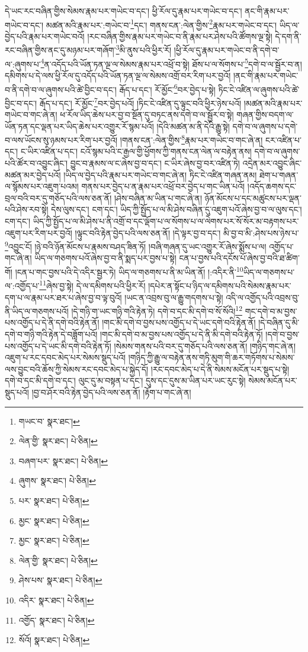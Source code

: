 དེ་ཡང་རང་བཞིན་གྱིས་སེམས་རྣམ་པར་གཡེང་བ་དང་། ཕྱི་རོལ་དུ་རྣམ་པར་གཡེང་བ་དང་། ནང་གི་རྣམ་པར་གཡེང་བ་དང་། མཚན་མའི་རྣམ་པར་:གཡེང་བ་\footnote{གཡང་བ་  སྣར་ཐང་། }དང་། གནས་ངན་:ལེན་གྱིས་\footnote{ལེན་གྱི་  སྣར་ཐང་།  པེ་ཅིན། }རྣམ་པར་གཡེང་བ་དང་། ཡིད་ལ་བྱེད་པའི་རྣམ་པར་གཡེང་བའོ། །རང་བཞིན་གྱིས་རྣམ་པར་གཡེང་བ་ནི་རྣམ་པར་ཤེས་པའི་ཚོགས་ལྔ་སྟེ། དེ་དག་ནི་རང་བཞིན་གྱིས་ནང་དུ་མཉམ་པར་གཞོག་\footnote{བཞག་པར་  སྣར་ཐང་།  པེ་ཅིན། }མི་ནུས་པའི་ཕྱིར་རོ། །ཕྱི་རོལ་དུ་རྣམ་པར་གཡེང་བ་ནི་དགེ་བ་ལ་:ཞུགས་པ་\footnote{ཞུགས་  སྣར་ཐང་།  པེ་ཅིན། }ན་འདོད་པའི་ཡོན་ཏན་ལྔ་ལ་སེམས་རྣམ་པར་འཕྲོ་བ་སྟེ། ཐོས་པ་ལ་སོགས་པ་\footnote{པར་  སྣར་ཐང་།  པེ་ཅིན། }དགེ་བ་ལ་སྦྱོར་བ་ན། དམིགས་པ་དེ་ལས་ཕྱི་རོལ་དུ་འདོད་པའི་ཡོན་ཏན་ལྔ་ལ་སེམས་འགྲོ་བར་རིག་པར་བྱའོ། །ནང་གི་རྣམ་པར་གཡེང་བ་ནི་དགེ་བ་ལ་ཞུགས་པའི་ཚེ་བྱིང་བ་དང་། རྒོད་པ་དང་། རོ་མྱོང་\footnote{མྱང་  སྣར་ཐང་།  པེ་ཅིན། }བར་བྱེད་པ་སྟེ། ཏིང་ངེ་འཛིན་ལ་ཞུགས་པའི་ཚེ་བྱིང་བ་དང་། རྒོད་པ་དང་། རོ་མྱོང་\footnote{མྱང་  སྣར་ཐང་།  པེ་ཅིན། }བར་བྱེད་པའོ། །ཏིང་ངེ་འཛིན་དུ་ལྟུང་བའི་ཕྱིར་ཉེས་པའོ། །མཚན་མའི་རྣམ་པར་གཡེང་བ་གང་ཞེ་ན། ཕ་རོལ་ཡིད་ཆེས་པར་བྱ་བ་སྔོན་དུ་བཏང་ནས་དགེ་བ་ལ་སྦྱོར་བ་སྟེ། གཞན་གྱིས་བདག་ལ་ཡོན་ཏན་དང་ལྡན་པར་ཡིད་ཆེས་པར་འགྱུར་རོ་སྙམ་པའོ། །དེའི་མཚན་མ་ནི་དེའི་རྒྱུ་སྟེ། དགེ་བ་ལ་ཞུགས་པ་དགེ་བ་ལས་ཡོངས་སུ་ཉམས་པར་རིག་པར་བྱའོ། །གནས་ངན་:ལེན་གྱིས་\footnote{ལེན་གྱི་  སྣར་ཐང་།  པེ་ཅིན། }རྣམ་པར་གཡེང་བ་གང་ཞེ་ན། ངར་འཛིན་པ་དང་། ང་ཡིར་འཛིན་པ་དང་། ངའོ་སྙམ་པའི་ང་རྒྱལ་གྱི་ཕྱོགས་ཀྱི་གནས་ངན་ལེན་ལ་བརྟེན་ནས། དགེ་བ་ལ་ཞུགས་པའི་ཚོར་བ་འབྱུང་ཞིང་། བྱུང་བ་རྣམས་ལ་ང་ཞེས་བྱ་བ་དང་། ང་ཡིར་ཞེས་བྱ་བར་འཛིན་ཏེ། འདྲེན་མར་འབྱུང་ཞིང་མཚན་མར་བྱེད་པའོ། །ཡིད་ལ་བྱེད་པའི་རྣམ་པར་གཡེང་བ་གང་ཞེ་ན། ཏིང་ངེ་འཛིན་གཞན་ནམ། ཐེག་པ་གཞན་ལ་སྙོམས་པར་འཇུག་པའམ། གནས་པར་བྱེད་པ་ན་རྣམ་པར་འཕྲོ་བར་བྱེད་པ་གང་ཡིན་པའོ། །འདོད་ཆགས་དང་བྲལ་བའི་བར་དུ་གཅོད་པའི་ལས་ཅན་ནོ། །ཤེས་བཞིན་མ་ཡིན་པ་གང་ཞེ་ན། ཉོན་མོངས་པ་དང་མཚུངས་པར་ལྡན་པའི་ཤེས་རབ་སྟེ། དེས་ལུས་དང་། ངག་དང་། ཡིད་ཀྱི་སྤྱོད་པ་ལ་མི་ཤེས་བཞིན་དུ་འཇུག་པའོ་ཞེས་བྱ་བ་ལ་ལུས་དང་། ངག་དང་། ཡིད་ཀྱི་སྤྱོད་པ་ལ་མི་ཤེས་པ་ནི་འགྲོ་བ་དང་ལྡོག་པ་ལ་སོགས་པ་ལ་ལེགས་པར་སོ་སོར་མ་བརྟགས་པར་འཇུག་པར་རིག་པར་བྱའོ། །ལྟུང་བའི་རྟེན་བྱེད་པའི་ལས་ཅན་ནོ། །དེ་ལྟར་བྱ་བ་དང་། མི་བྱ་བ་མི་:ཤེས་པས་ཉེས་པ་\footnote{ཤེས་པས་  སྣར་ཐང་།  པེ་ཅིན། }འབྱུང་ངོ། །ཉེ་བའི་ཉོན་མོངས་པ་རྣམས་བཤད་ཟིན་ཏོ། །བཞི་གཞན་དུ་ཡང་འགྱུར་རོ་ཞེས་སྨོས་པ་ལ། འགྱོད་པ་གང་ཞེ་ན། ཡིད་ལ་གཅགས་པའོ་ཞེས་བྱ་བ་ནི་སྨད་པར་བྱས་པ་སྟེ། ངན་པ་བྱས་པའི་དངོས་པོ་ཞེས་བྱ་བའི་ཐ་ཚིག་གོ། །ངན་པ་གང་བྱས་པའི་དེ་འདིར་སྦྱར་ཏེ། ཡིད་ལ་གཅགས་པ་ནི་མ་ཡིན་ནོ། །:འདིར་ནི་\footnote{འདིར་  སྣར་ཐང་།  པེ་ཅིན། }ཡིད་ལ་གཅགས་པ་ལ་:འགྱོད་པ་\footnote{འགྱོད་  སྣར་ཐང་།  པེ་ཅིན། }ཞེས་བྱ་སྟེ། དེ་ལ་དམིགས་པའི་ཕྱིར་རོ། །དཔེར་ན་སྟོང་པ་ཉིད་ལ་དམིགས་པའི་སེམས་རྣམ་པར་དག་པ་ལ་རྣམ་པར་ཐར་པ་ཞེས་བྱ་བ་ལྟ་བུའོ། །ཡང་ན་འབྲས་བུ་ལ་རྒྱུ་གདགས་པ་སྟེ། འདི་ལ་འགྱོད་པའི་འབྲས་བུ་ནི་ཡིད་ལ་གཅགས་པའོ། །དེ་གཉི་ག་ཡང་གཉི་གའི་རྟེན་ཏེ། དགེ་བ་དང་མི་དགེ་བ་སོ་སོའི།\footnote{སོའོ།  སྣར་ཐང་།  པེ་ཅིན། } གང་དགེ་བ་མ་བྱས་པས་འགྱོད་པ་དེ་ནི་དགེ་བའི་རྟེན་ནོ། །གང་མི་དགེ་བ་བྱས་པས་འགྱོད་པ་དེ་ཡང་དགེ་བའི་རྟེན་ནོ། །དེ་བཞིན་དུ་མི་དགེ་བ་གཉི་གའི་རྟེན་དེ་བཟློག་པའོ། །གང་མི་དགེ་བ་མ་བྱས་པས་འགྱོད་པ་དེ་ནི་མི་དགེ་བའི་རྟེན་ཏོ། །དགེ་བ་བྱས་པས་འགྱོད་པ་དེ་ཡང་མི་དགེ་བའི་རྟེན་ཏོ། །སེམས་གནས་པའི་བར་དུ་གཅོད་པའི་ལས་ཅན་ནོ། །གཉིད་གང་ཞེ་ན། འཇུག་པ་རང་དབང་མེད་པར་སེམས་སྡུད་པའོ། །གཉིད་ཀྱི་རྒྱུ་ལ་བརྟེན་ནས་གཏི་མུག་གི་ཆར་གཏོགས་པ་སེམས་ལས་བྱུང་བའི་ཆོས་ཀྱི་སེམས་རང་དབང་མེད་པ་སྐྱེད་དོ། །རང་དབང་མེད་པ་དེ་ནི་སེམས་མངོན་པར་སྡུད་པ་སྟེ། དགེ་བ་དང་མི་དགེ་བ་དང་། ལུང་དུ་མ་བསྟན་པ་དང་། དུས་དང་དུས་མ་ཡིན་པར་ཡང་རུང་སྟེ། སེམས་མངོན་པར་སྡུད་པའོ། །བྱ་བ་ཤོར་བའི་རྟེན་བྱེད་པའི་ལས་ཅན་ནོ། །རྟོག་པ་གང་ཞེ་ན། 